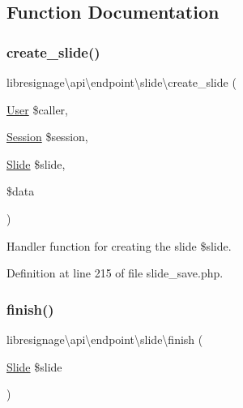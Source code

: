 \subsection{Function Documentation}
\mbox{\label{namespacelibresignage_1_1api_1_1endpoint_1_1slide_a77dd0fedf73d886c2c4c08f72fbe1715}} 
\subsubsection{\texorpdfstring{create\+\_\+slide()}{create\_slide()}}
{\footnotesize\ttfamily libresignage\textbackslash{}api\textbackslash{}endpoint\textbackslash{}slide\textbackslash{}create\+\_\+slide (\begin{DoxyParamCaption}\item[{\hyperlink{classlibresignage_1_1common_1_1php_1_1auth_1_1User}{User}}]{\$caller,  }\item[{\hyperlink{classlibresignage_1_1common_1_1php_1_1auth_1_1Session}{Session}}]{\$session,  }\item[{\hyperlink{classlibresignage_1_1common_1_1php_1_1slide_1_1Slide}{Slide}}]{\$slide,  }\item[{}]{\$data }\end{DoxyParamCaption})}

Handler function for creating the slide \$slide. 

Definition at line 215 of file slide\+\_\+save.\+php.

\mbox{\label{namespacelibresignage_1_1api_1_1endpoint_1_1slide_a720121a1a9d64869e0980f74c6740766}} 
\subsubsection{\texorpdfstring{finish()}{finish()}}
{\footnotesize\ttfamily libresignage\textbackslash{}api\textbackslash{}endpoint\textbackslash{}slide\textbackslash{}finish (\begin{DoxyParamCaption}\item[{\hyperlink{classlibresignage_1_1common_1_1php_1_1slide_1_1Slide}{Slide}}]{\$slide }\end{DoxyParamCaption})}

